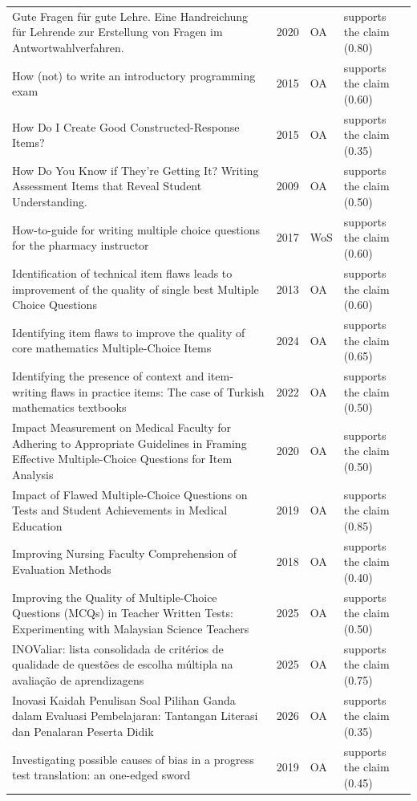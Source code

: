 \begin{longtable}{@{}%
  >{\raggedright\arraybackslash}p{}c%
  >{\raggedright\arraybackslash}p{}%
  >{\raggedright\arraybackslash}p{}@{}}
Gute Fragen für gute Lehre. Eine Handreichung für Lehrende zur Erstellung von Fragen im Antwortwahlverfahren. & 2020 & OA & supports the claim (0.80) \\
How (not) to write an introductory programming exam & 2015 & OA & supports the claim (0.60) \\
How Do I Create Good Constructed-Response Items? & 2015 & OA & supports the claim (0.35) \\
How Do You Know if They're Getting It? Writing Assessment Items that Reveal Student Understanding. & 2009 & OA & supports the claim (0.50) \\
How-to-guide for writing multiple choice questions for the pharmacy instructor & 2017 & WoS & supports the claim (0.60) \\
Identification of technical item flaws leads to improvement of the quality of single best Multiple Choice Questions & 2013 & OA & supports the claim (0.60) \\
Identifying item flaws to improve the quality of core mathematics Multiple-Choice Items & 2024 & OA & supports the claim (0.65) \\
Identifying the presence of context and item-writing flaws in practice items: The case of Turkish mathematics textbooks & 2022 & OA & supports the claim (0.50) \\
Impact Measurement on Medical Faculty for Adhering to Appropriate Guidelines in Framing Effective Multiple-Choice Questions for Item Analysis & 2020 & OA & supports the claim (0.50) \\
Impact of Flawed Multiple-Choice Questions on Tests and Student Achievements in Medical Education & 2019 & OA & supports the claim (0.85) \\
Improving Nursing Faculty Comprehension of Evaluation Methods & 2018 & OA & supports the claim (0.40) \\
Improving the Quality of Multiple-Choice Questions (MCQs) in Teacher Written Tests: Experimenting with Malaysian Science Teachers & 2025 & OA & supports the claim (0.50) \\
INOValiar: lista consolidada de critérios de qualidade de questões de escolha múltipla na avaliação de aprendizagens & 2025 & OA & supports the claim (0.75) \\
Inovasi Kaidah Penulisan Soal Pilihan Ganda dalam Evaluasi Pembelajaran: Tantangan Literasi dan Penalaran Peserta Didik & 2026 & OA & supports the claim (0.35) \\
Investigating possible causes of bias in a progress test translation: an one-edged sword & 2019 & OA & supports the claim (0.45) \\

\end{longtable}
